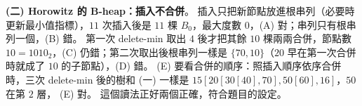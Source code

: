 \begin{pastsoln}
\textbf{(二) Horowitz 的 B-heap：插入不合併}。 插入只把新節點放進根串列（必要時更新最小值指標），$11$ 次插入後是 $11$ 棵
$B_0$，最大度數 $0$，(A) 對；串列只有根串列一個，(B) 錯。 第一次 delete-min 取出 $4$ 後才把其餘 $10$ 棵兩兩合併，節點數
$10 = 1010_2$，(C) 仍錯；第二次取出後根串列一樣是 $\{70, 10\}$（$20$ 早在第一次合併時就成了 $10$ 的子節點），(D) 錯。 (E)
要看合併的順序：照插入順序依序合併時，三次 delete-min 後的樹和 (一) 一樣是 $15[20[30[40], 70], 50[60], \allowbreak 16]$，$50$ 在第 $2$ 層，
(E) 對。 這個讀法正好兩個正確，符合題目的設定。
\end{pastsoln}
